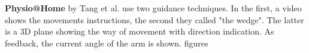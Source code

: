 \textbf{Physio@Home} by Tang et al. \cite{Tang2015} use two guidance techniques. In the first, a video shows the movements instructions, the second they called "the wedge". The latter is a 3D plane showing the way of movement with direction indication. As feedback, the current angle of the arm is shown. \todo figures

